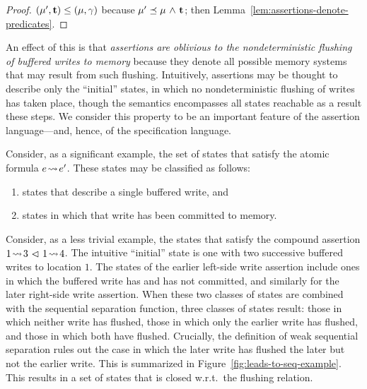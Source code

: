 \documentclass[11pt]{report}
\begin{document}
\begin{proof}
$(\mu',\mathbf{t}) \leq (\mu,\gamma)$ because $\mu' \preceq \mu \operatorname{\,\wedge\,} \mathbf{t}$; then Lemma~\ref{lem:assertions-denote-predicates}. 
\end{proof}

An effect of this is that \emph{assertions are oblivious to the nondeterministic flushing of buffered writes to memory} because they denote all possible memory systems that may result from such flushing. Intuitively, assertions may be thought to describe only the ``initial'' states, in which no nondeterministic flushing of writes has taken place, though the semantics encompasses all states reachable as a result these steps. We consider this property to be an important feature of the assertion language---and, hence, of the specification language. 

Consider, as a significant example, the set of states that satisfy the atomic formula $e \!\leadsto\! e'$. These states may be classified as follows: \begin{enumerate}
    \item states that describe a single buffered write, and 
    \item states in which that write has been committed to memory. 
\end{enumerate} Consider, as a less trivial example, the states that satisfy the compound assertion $1 \!\leadsto\! 3 \operatorname{\,\vartriangleleft\,} 1 \!\leadsto\! 4$. The intuitive ``initial'' state is one with two successive buffered writes to location $1$. The states of the earlier left-side write assertion include ones in which the buffered write has and has not committed, and similarly for the later right-side write assertion. When these two classes of states are combined with the sequential separation function, three classes of states result: those in which neither write has flushed, those in which only the earlier write has flushed, and those in which both have flushed. Crucially, the definition of weak sequential separation rules out the case in which the later write has flushed the later but not the earlier write. This is summarized in Figure~\ref{fig:leads-to-seq-example}. This results in a set of states that is closed w.r.t.~the flushing relation. 
 
\end{document}
